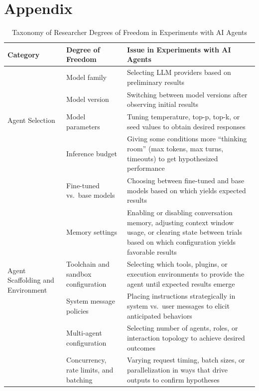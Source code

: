 \documentclass{article}
\theoremstyle{plain}
\theoremstyle{definition}
\theoremstyle{remark}
\begin{document}
\section{Appendix}

\begin{table}[htp]
\centering
\caption{Taxonomy of Researcher Degrees of Freedom in Experiments with AI Agents}
\label{tab:taxonomy}
\scriptsize
\begin{tabularx}{\textwidth}{@{}p{3cm}p{3.2cm}X@{}}
\toprule
\textbf{Category} & \textbf{Degree of Freedom} & \textbf{Issue in Experiments with AI Agents} \\
\midrule

\multirow{4}{*}{\parbox{2.4cm}{Agent Selection}} 
 & Model family & Selecting LLM providers based on preliminary results \\[0.5em]
 & Model version & Switching between model versions after observing initial results \\[0.5em]
 & Model parameters & Tuning temperature, top-p, top-k, or seed values to obtain desired responses \\[0.5em]
 & Inference budget & Giving some conditions more “thinking room” (max tokens, max turns, timeouts) to get hypothesized performance \\[0.5em]
 & Fine-tuned vs.\ base models & Choosing between fine-tuned and base models based on which yields expected results \\
\midrule

\multirow{4}{*}{\parbox{2.4cm}{Agent Scaffolding and Environment}} 
 & Memory settings & Enabling or disabling conversation memory, adjusting context window usage, or clearing state between trials based on which configuration yields favorable results \\[0.5em]
 & Toolchain and sandbox configuration & Selecting which tools, plugins, or execution environments to provide the agent until expected results emerge \\[0.5em]
 & System message policies & Placing instructions strategically in system vs.\ user messages to elicit anticipated behaviors \\[0.5em]
 & Multi-agent configuration & Selecting number of agents, roles, or interaction topology to achieve desired outcomes \\[0.5em]
 & Concurrency, rate limits, and batching & Varying request timing, batch sizes, or parallelization in ways that drive outputs to confirm hypotheses \\
\midrule


\end{tabularx}
\end{table}
\end{document}
